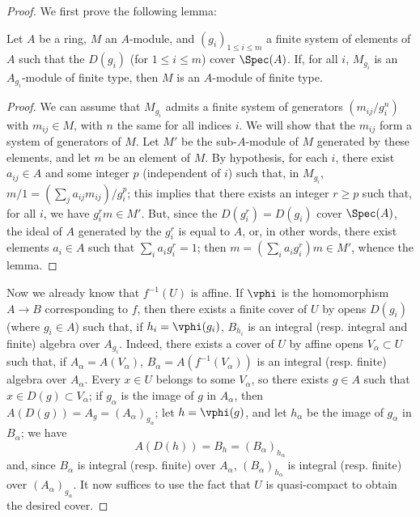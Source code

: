 \begin{proof}
We first prove the following lemma:

  \begin{lemma}[6.1.4.1]
  \label{II.6.1.4.1}
  Let $A$ be a ring, $M$ an $A$-module, and $(g_i)_{1\leq i\leq m}$ a finite system of elements of $A$ such that the $D(g_i)$ (for $1\leq i\leq m$) cover $\Spec(A)$.
  If, for all $i$, $M_{g_i}$ is an $A_{g_i}$-module of finite type, then $M$ is an $A$-module of finite type.
  \end{lemma}

  \begin{proof}
  We can assume that $M_{g_i}$ admits a finite system of generators $(m_{ij}/g_i^n)$ with $m_{ij}\in M$, with $n$ the same for all indices $i$.
  We will show that the $m_{ij}$ form a system of generators of $M$.
  Let $M'$ be the sub-$A$-module of $M$ generated by these elements, and let $m$ be an element of $M$.
  By hypothesis, for each $i$, there exist $a_{ij}\in A$ and some integer $p$ (independent of $i$) such that, in $M_{g_i}$, $m/1=(\sum_j a_{ij}m_{ij})/g_i^p$;
  this implies that there exists an integer $r\geq p$ such that, for all $i$, we have $g_i^rm\in M'$.
  But, since the $D(g_i^r)=D(g_i)$ cover $\Spec(A)$, the ideal of $A$ generated by the $g_i^r$ is equal to $A$, or, in other words, there exist elements $a_i\in A$ such that $\sum_i a_ig_i^r=1$;
  then $m=(\sum_i a_i g_i^r)m\in M'$, whence the lemma.
  \end{proof}

Now we already know  that $f^{-1}(U)$ is affine.
If $\vphi$ is the homomorphism $A\to B$ corresponding to $f$, then there exists a finite cover of $U$ by opens $D(g_i)$ (where $g_i\in A$) such that, if $h_i=\vphi(g_i)$, $B_{h_i}$ is an integral (resp. integral and finite) algebra over $A_{g_i}$.
Indeed, there exists a cover of $U$ by affine opens $V_\alpha\subset U$ such that, if $A_\alpha=A(V_\alpha)$, $B_\alpha=A(f^{-1}(V_\alpha))$ is an integral (resp. finite) algebra over $A_\alpha$.
Every $x\in U$ belongs to some $V_\alpha$, so there exists $g\in A$ such that $x\in D(g)\subset V_\alpha$;
if $g_\alpha$ is the image of $g$ in $A_\alpha$, then $A(D(g))=A_g=(A_\alpha)_{g_\alpha}$;
let $h=\vphi(g)$, and let $h_\alpha$ be the image of $g_\alpha$ in $B_\alpha$;
we have
\[
  A(D(h)) = B_h = (B_\alpha)_{h_\alpha}
\]
and, since $B_\alpha$ is integral (resp. finite) over $A_\alpha$, $(B_\alpha)_{h_\alpha}$ is integral (resp. finite) over $(A_\alpha)_{g_\alpha}$.
It now suffices to use the fact that $U$ is quasi-compact to obtain the desired cover.


\end{proof}
